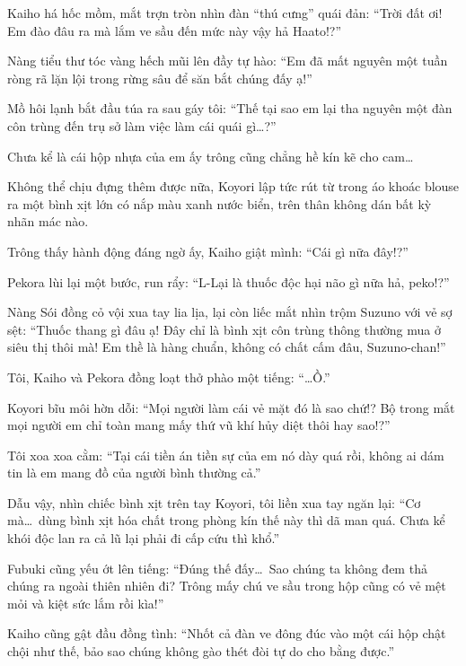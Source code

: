 \documentclass[../main.tex]{subfiles}
\begin{document}

Kaiho há hốc mồm, mắt trợn tròn nhìn đàn ``thú cưng'' quái đản: ``Trời đất ơi! Em đào đâu ra mà lắm ve sầu đến mức này vậy hả Haato!?''

Nàng tiểu thư tóc vàng hếch mũi lên đầy tự hào: ``Em đã mất nguyên một tuần ròng rã lặn lội trong rừng sâu để săn bắt chúng đấy ạ!''

Mồ hôi lạnh bắt đầu túa ra sau gáy tôi: ``Thế tại sao em lại tha nguyên một đàn côn trùng đến trụ sở làm việc làm cái quái gì\dots?''

Chưa kể là cái hộp nhựa của em ấy trông cũng chẳng hề kín kẽ cho cam\dots

Không thể chịu đựng thêm được nữa, Koyori lập tức rút từ trong áo khoác blouse ra một bình xịt lớn có nắp màu xanh nước biển, trên thân không dán bất kỳ nhãn mác nào.


Trông thấy hành động đáng ngờ ấy, Kaiho giật mình: ``Cái gì nữa đây!?''

Pekora lùi lại một bước, run rẩy: ``L-Lại là thuốc độc hại não gì nữa hả, peko!?''

Nàng Sói đồng cỏ vội xua tay lia lịa, lại còn liếc mắt nhìn trộm Suzuno với vẻ sợ sệt: ``Thuốc thang gì đâu ạ! Đây chỉ là bình xịt côn trùng thông thường mua ở siêu thị thôi mà! Em thề là hàng chuẩn, không có chất cấm đâu, Suzuno-chan!''

Tôi, Kaiho và Pekora đồng loạt thở phào một tiếng: ``\dots Ồ.''

Koyori bĩu môi hờn dỗi: ``Mọi người làm cái vẻ mặt đó là sao chứ!? Bộ trong mắt mọi người em chỉ toàn mang mấy thứ vũ khí hủy diệt thôi hay sao!?''

Tôi xoa xoa cằm: ``Tại cái tiền án tiền sự của em nó dày quá rồi, không ai dám tin là em mang đồ của người bình thường cả.''

Dẫu vậy, nhìn chiếc bình xịt trên tay Koyori, tôi liền xua tay ngăn lại: ``Cơ mà\dots\ dùng bình xịt hóa chất trong phòng kín thế này thì dã man quá. Chưa kể khói độc lan ra cả lũ lại phải đi cấp cứu thì khổ.''

Fubuki cũng yếu ớt lên tiếng: ``Đúng thế đấy\dots\ Sao chúng ta không đem thả chúng ra ngoài thiên nhiên đi? Trông mấy chú ve sầu trong hộp cũng có vẻ mệt mỏi và kiệt sức lắm rồi kìa!''

Kaiho cũng gật đầu đồng tình: ``Nhốt cả đàn ve đông đúc vào một cái hộp chật chội như thế, bảo sao chúng không gào thét đòi tự do cho bằng được.''
\end{document}
